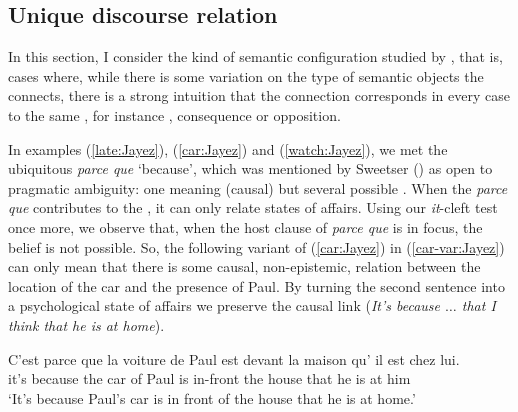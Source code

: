 \documentclass[output=paper,colorlinks,citecolor=brown]{langscibook}
\begin{document}
\subsection{Unique discourse relation}

\label{sec-unique-DR:Jayez}

In this section, I consider the kind of semantic configuration studied by \citet{Sweetser:1990}, that is, cases where, while there is some variation on the type of semantic objects the  connects, there is a strong intuition that the connection corresponds in every case to the same , for instance , consequence or opposition.

In examples (\ref{late:Jayez}), (\ref{car:Jayez}) and (\ref{watch:Jayez}), we met the ubiquitous  \textit{parce que} `because', which was mentioned by Sweetser (\citeyear{Sweetser:1990}) as open to pragmatic ambiguity: one meaning (causal) but several possible . When the  \textit{parce que} contributes to the , it can only relate states of affairs. Using our \textit{it}-cleft test once more, we observe that, when the host clause of \textit{parce que} is in focus, the belief  is not possible. So, the following variant of (\ref{car:Jayez}) in (\ref{car-var:Jayez}) can only mean that there is some causal, non-epistemic, relation between the location of the car and the presence of Paul. By turning the second sentence into a psychological state of affairs we preserve the causal link (\textit{It's because $\dots$ that I think that he is at home}).


\ea
\label{car-var:Jayez}
\gll C'est {parce que} la voiture de Paul est devant la maison qu' il est chez lui.\\
it's because the car of Paul is {in-front} the house that he is at him\\
\glt `It's because Paul's car is in front of the house that he is at home.'
\z
\end{document}
